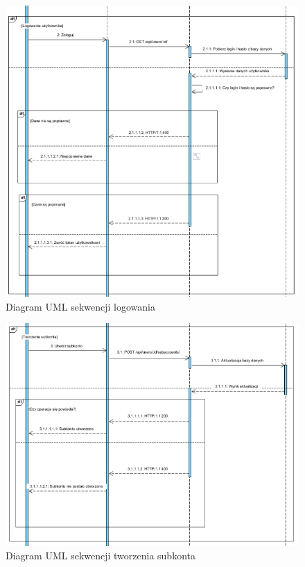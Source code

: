 \documentclass{article}
\begin{document}
	\begin{figure}[H]
		\hspace*{-2.5cm} 
		\includegraphics[scale=0.9]{assets/sq2.png}
		\caption[]{Diagram UML sekwencji logowania}
		\label{fig:umllog}
	\end{figure} 
	\begin{figure}[h]
		\vspace{-3.5cm}
		\hspace*{-2.5cm} 
		\includegraphics[scale=0.9]{assets/sq3.png}
		\caption[]{Diagram UML sekwencji tworzenia subkonta}
		\label{fig:umlsub}
	\end{figure} 
\end{document}

